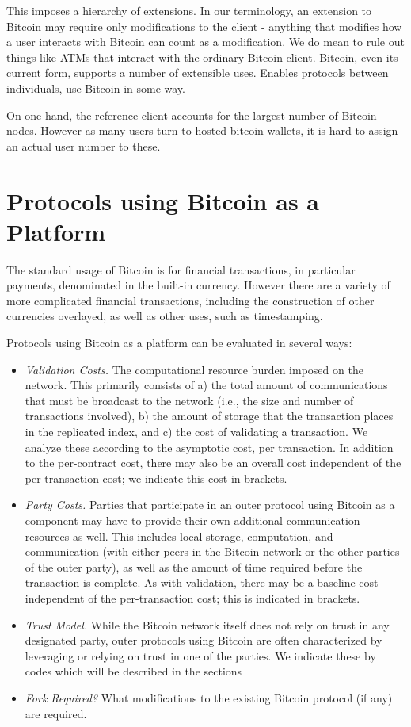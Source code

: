 This imposes a hierarchy of extensions. In our terminology, an extension to Bitcoin may require only modifications to the client - anything that modifies how a user interacts with Bitcoin can count as a modification. We do mean to rule out things like ATMs that interact with the ordinary Bitcoin client. Bitcoin, even its current form, supports a number of extensible uses. Enables protocols between individuals, use Bitcoin in some way.

On one hand, the reference client accounts for the largest number of Bitcoin nodes. However as many users turn to hosted bitcoin wallets, it is hard to assign an actual user number to these.


\section{ Protocols using Bitcoin as a Platform }

The standard usage of Bitcoin is for financial transactions, in particular payments, denominated in the built-in currency. However there are a variety of more complicated financial transactions, including the construction of other currencies overlayed, as well as other uses, such as timestamping.

Protocols using Bitcoin as a platform can be evaluated in several ways:
\begin{itemize}
\item {\em Validation Costs.} The computational resource burden imposed on the network. This primarily consists of a) the total amount of communications that must be broadcast to the network (i.e., the size and number of transactions involved), b) the amount of storage that the transaction places in the replicated index, and c) the cost of validating a transaction. We analyze these according to the asymptotic cost, per transaction. In addition to the per-contract cost, there may also be an overall cost independent of the per-transaction cost; we indicate this cost in brackets.

\item {\em Party Costs.} Parties that participate in an outer protocol using Bitcoin as a component may have to provide their own additional communication resources as well. This includes local storage, computation, and communication (with either peers in the Bitcoin network or the other parties of the outer party), as well as the amount of time required before the transaction is complete. As with validation, there may be a baseline cost independent of the per-transaction cost; this is indicated in brackets.

\item {\em Trust Model.} While the Bitcoin network itself does not rely on trust in any designated party, outer protocols using Bitcoin are often characterized by leveraging or relying on trust in one of the parties. We indicate these by codes which will be described in the sections 

\item {\em Fork Required?} What modifications to the existing Bitcoin protocol (if any) are required.
\end{itemize}

